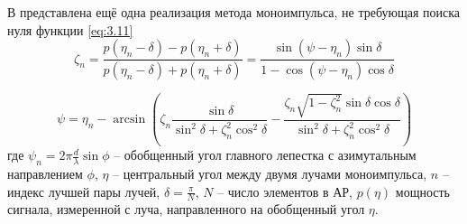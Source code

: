 



В \cite{Zhu2016} представлена ещё одна реализация метода моноимпульса, не требующая 
поиска нуля функции \eqref{eq:3.11}
\begin{equation}
    \label{eq:3.19}
    \zeta_n = \frac{p(\eta_n - \delta) - p(\eta_n + \delta)}{p(\eta_n - \delta)
        + p(\eta_n + \delta)} =
    \frac{\sin(\psi - \eta_n)\sin\delta}{1 - \cos(\psi - \eta_n)\cos \delta}
\end{equation}

\begin{equation}
    \label{eq:3.20}
    \psi = \eta_n - \arcsin(
    \zeta_n \frac{\sin\delta}{\sin^2 \delta + \zeta^2_n \cos^2\delta}
    -
    \frac{\zeta_n \sqrt{1-\zeta^2_n} \sin \delta \cos \delta}{\sin^2\delta +
        \zeta^2_n \cos^2 \delta}
    )
\end{equation}
где $\psi_n = 2\pi \frac{d}{\lambda} \sin \phi$ -- обобщенный угол 
главного лепестка с азимутальным направлением $\phi$,  $\eta$ -- центральный угол между двумя лучами моноимпульса, 
$n$ -- индекс лучшей пары лучей, $\delta = \frac{\pi}{N}$, $N$ -- число элементов в АР, $p(\eta)$ 
мощность сигнала, измеренной с луча, направленного на обобщенный угол $\eta$.

